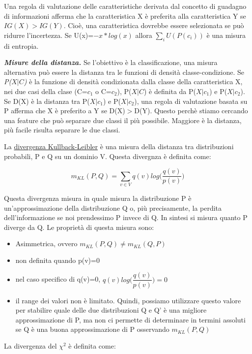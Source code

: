 \documentclass[a4paper]{extarticle}
\begin{document}
Una regola di valutazione delle caratteristiche derivata dal concetto di guadagno di informazioni afferma che la caratteristica X è preferita alla caratteristica Y se $IG(X)>IG(Y)$. Cioè, una caratteristica dovrebbe essere selezionata se può ridurre l'incertezza. Se U(x)=$-x*log(x)$ allora $\sum_{i}U(P(c_i))$ è una misura di entropia.

\textbf{\textit{Misure della distanza.}} Se l'obiettivo è la classificazione, una misura alternativa può essere la distanza tra le funzioni di densità classe-condizione. Se \textit{P($X|C$)} è la funzione di densità condizionata dalla classe della caratteristica X, nei due casi della clase (C=$c_1$ o C=$c_2$), P($X|C$) è definita da P($X|c_1$) e P($X|c_2$). Se D(X) è la distanza tra P($X|c_1$) e P($X|c_2$), una regola di valutazione basata su P afferma che X è preferito a Y se D(X)$>$D(Y). Questo perchè stiamo cercando una feature che può separare due classi il più possibile. Maggiore è la distanza, più facile risulta separare le due classi.

La \underline{divergenza Kullback-Leibler} è una misura della distanza tra distribuzioni probabili, P e Q su un dominio V. Questa divergnza è definita come:

\begin{equation*}
m_{KL}(P,Q)= \sum_{v\in V} q(v)log \Biggr(\dfrac {q(v)}{p(v)}\Biggl)
\end{equation*}

Questa divergenza misura in quale misura la distribuzione P è un'approssimazione della distribuzione Q o, più precisamente, la perdita dell'informazione se noi prendessimo P invece di Q. In sintesi si misura quanto P diverge da Q. Le proprietà di questa misura sono:

\begin{itemize}
\item Asimmetrica, ovvero $m_{KL}(P,Q) \not = m_{KL}(Q,P)$
\item non definita quando p(v)=0
\item nel caso specifico di q(v)=0, $q(v)log\Biggr(\dfrac{q(v)}{p(v)}\Biggl)=0$
\item il range dei valori non è limitato. Quindi, possiamo utilizzare questo valore per stabilire quale delle due distribuzioni Q e Q' è una migliore approssimazione di P, ma non ci permette di determinare in termini assoluti se Q è una buona approssimazione di P osservando $m_{KL}(P,Q)$
\end{itemize} 

La divergenza del $\chi ^2$ è definita come:
\end{document}
